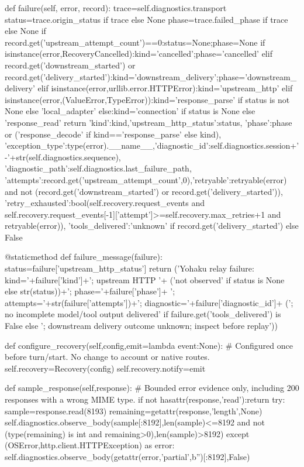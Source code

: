     def failure(self, error, record):
        trace=self.diagnostics.transport
        status=trace.origin_status if trace else None
        phase=trace.failed_phase if trace else None
        if record.get('upstream_attempt_count')==0:status=None;phase=None
        if isinstance(error,RecoveryCancelled):kind='cancelled';phase='cancelled'
        elif record.get('downstream_started') or record.get('delivery_started'):kind='downstream_delivery';phase='downstream_delivery'
        elif isinstance(error,urllib.error.HTTPError):kind='upstream_http'
        elif isinstance(error,(ValueError,TypeError)):kind='response_parse' if status is not None else 'local_adapter'
        else:kind='connection' if status is None else 'response_read'
        return {'kind':kind,'upstream_http_status':status,
            'phase':phase or ('response_decode' if kind=='response_parse' else kind),
            'exception_type':type(error).__name__,'diagnostic_id':self.diagnostics.session+'-'+str(self.diagnostics.sequence),
            'diagnostic_path':self.diagnostics.last_failure_path,
            'attempts':record.get('upstream_attempt_count',0),'retryable':retryable(error) and not (record.get('downstream_started') or record.get('delivery_started')),
            'retry_exhausted':bool(self.recovery.request_events and self.recovery.request_events[-1]['attempt']>=self.recovery.max_retries+1 and retryable(error)),
            'tools_delivered':'unknown' if record.get('delivery_started') else False}

    @staticmethod
    def failure_message(failure):
        status=failure['upstream_http_status']
        return ('Yohaku relay failure: kind='+failure['kind']+'; upstream HTTP '+
            ('not observed' if status is None else str(status))+'; phase='+failure['phase']+
            '; attempts='+str(failure['attempts'])+'; diagnostic='+failure['diagnostic_id']+
            ('; no incomplete model/tool output delivered' if failure.get('tools_delivered') is False else '; downstream delivery outcome unknown; inspect before replay'))

    def configure_recovery(self,config,emit=lambda event:None):
        # Configured once before turn/start. No change to account or native routes.
        self.recovery=Recovery(config)
        self.recovery.notify=emit

    def sample_response(self,response):
        # Bounded error evidence only, including 200 responses with a wrong MIME type.
        if not hasattr(response,'read'):return
        try:
            sample=response.read(8193)
            remaining=getattr(response,'length',None)
            self.diagnostics.observe_body(sample[:8192],len(sample)<=8192 and not (type(remaining) is int and remaining>0),len(sample)>8192)
        except (OSError,http.client.HTTPException) as error:
            self.diagnostics.observe_body(getattr(error,'partial',b'')[:8192],False)

